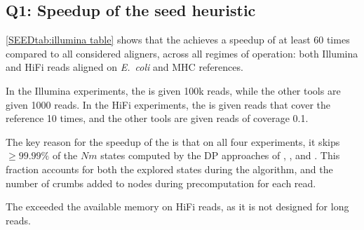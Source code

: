 \subsection{Q1: Speedup of the seed heuristic}
%
\cref{SEEDtab:illumina table} shows that the \seedh achieves a speedup of at least
60 times compared to all considered aligners, across all regimes of operation:
both Illumina and HiFi reads aligned on \textit{E.~coli} and MHC references.

In the Illumina experiments, the \seedh is given 100k reads, while the other
tools are given 1000 reads. In the HiFi experiments, the \seedh is given reads
that cover the reference 10 times, and the other tools are given reads of
coverage 0.1.

The key reason for the speedup of the \seedh is that on all four experiments, it
skips $\geq 99.99\%$ of the $Nm$ states computed by the DP approaches of
\graphaligner, \pasgal, and \vargas. This fraction accounts for both the
explored states during the \A algorithm, and the number of crumbs added to nodes
during precomputation for each read.

The \prefixh exceeded the available memory on HiFi reads, as it is not designed
for long reads.
